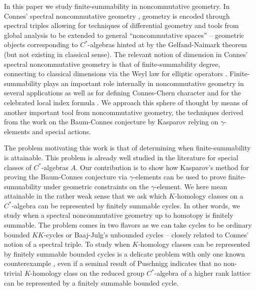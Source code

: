 \documentclass[a4paper,reqno]{amsart}
\numberwithin{equation}{section}
\theoremstyle{definition}
\theoremstyle{remark}
\begin{document}
In this paper we study finite-summability in noncommutative geometry. In Connes' spectral noncommutative geometry \cite{redbook}, geometry is encoded through spectral triples allowing for techniques of differential geometry and tools from global analysis to be extended to general ``noncommutative spaces'' -- geometric objects corresponding to $C^*$-algebras hinted at by the Gelfand-Naimark theorem (but not existing in classical sense). The relevant notion of dimension in Connes' spectral noncommutative geometry is that of finite-summability degree, connecting to classical dimensions via the Weyl law for elliptic operators \cite{horIV}. Finite-summability plays an important role internally in noncommutative geometry in several applications as well as for defining Connes-Chern character and for the celebrated local index formula \cite{connesmoscovici}. We approach this sphere of thought by means of another important tool from noncommutative geometry, the techniques derived from the work on the Baum-Connes conjecture by Kasparov \cite{kaspinv} relying on $\gamma$-elements and special actions.


The problem motivating this work is that of determining when finite-summability is attainable. This problem is already well studied in the literature \cite{EmDuw,EN, GM15,GRU, Pusch} for special classes of $C^*$-algebras $A$. Our contribution is to show how Kasparov's method for proving the Baum-Connes conjecture via $\gamma$-elements can be used to prove finite-summability under geometric constraints on the $\gamma$-element. We here mean attainable in the rather weak sense that we ask which $K$-homology classes on a $C^*$-algebra can be represented by finitely summable cycles. In other words, we study when a spectral noncommutative geometry up to homotopy is finitely summable. The problem comes in two flavors as we can take cycles to be ordinary bounded $KK$-cycles or Baaj-Julg's unbounded cycles -- closely related to Connes' notion of a spectral triple. To study when $K$-homology classes can be represented by finitely summable bounded cycles is a delicate problem with only one known counterexample \cite{GM15}, even if a seminal result of Puschnigg \cite{Pusch} indicates that no non-trivial $K$-homology class on the reduced group $C^*$-algebra of a higher rank lattice can be represented by a finitely summable bounded cycle. 
\end{document}
